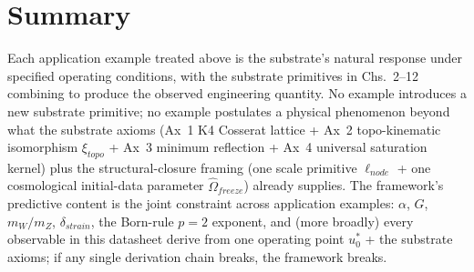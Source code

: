 \section{Summary}
\label{sec:vol9_app_summary}

Each application example treated above is the substrate's natural response under specified operating conditions, with the substrate primitives in Chs.~2--12 combining to produce the observed engineering quantity. No example introduces a new substrate primitive; no example postulates a physical phenomenon beyond what the substrate axioms (Ax~1 K4 Cosserat lattice + Ax~2 topo-kinematic isomorphism $\xi_{topo}$ + Ax~3 minimum reflection + Ax~4 universal saturation kernel) plus the structural-closure framing (one scale primitive $\ell_{node}$ + one cosmological initial-data parameter $\hat{\Omega}_{freeze}$) already supplies. The framework's predictive content is the joint constraint across application examples: $\alpha$, $G$, $m_W/m_Z$, $\delta_{strain}$, the Born-rule $p=2$ exponent, and (more broadly) every observable in this datasheet derive from one operating point $u_0^*$ + the substrate axioms; if any single derivation chain breaks, the framework breaks.

